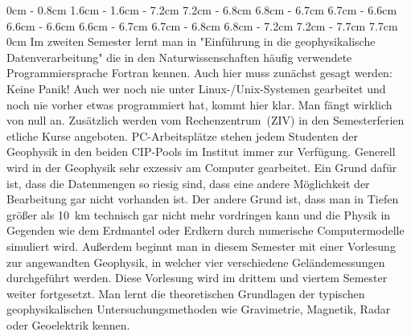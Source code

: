 \begin{multicols}{2}
{}
0cm \columnwidth
0cm \columnwidth
0cm \columnwidth
0cm \columnwidth
0cm \columnwidth
0cm \columnwidth
0cm \columnwidth
0cm \columnwidth
0.8cm \dimexpr\columnwidth - 0.8cm
1.6cm \dimexpr\columnwidth - 1.6cm
\dimexpr\columnwidth - 7.2cm 7.2cm
\dimexpr\columnwidth - 6.8cm 6.8cm
\dimexpr\columnwidth - 6.7cm 6.7cm
\dimexpr\columnwidth - 6.6cm 6.6cm
\dimexpr\columnwidth - 6.6cm 6.6cm
\dimexpr\columnwidth - 6.7cm 6.7cm
\dimexpr\columnwidth - 6.8cm 6.8cm
\dimexpr\columnwidth - 7.2cm 7.2cm
\dimexpr\columnwidth - 7.7cm 7.7cm
0cm \columnwidth
0cm \columnwidth
0cm \columnwidth
0cm \columnwidth
0cm \columnwidth
Im zweiten Semester lernt man in "Einführung in die geophysikalische Datenverarbeitung" die in den Naturwissenschaften häufig verwendete Programmiersprache Fortran kennen.
Auch hier muss zunächst gesagt werden: Keine Panik! Auch wer noch nie unter Linux-/Unix-Systemen gearbeitet und noch nie vorher etwas programmiert hat, kommt hier klar.
Man fängt wirklich von null an.
Zusätzlich werden vom Rechenzentrum~(ZIV) in den Semesterferien etliche Kurse angeboten.
PC-Arbeitsplätze stehen jedem Studenten der Geophysik in den beiden CIP-Pools im Institut immer zur Verfügung.
Generell wird in der Geophysik sehr exzessiv am Computer gearbeitet.
Ein Grund dafür ist, dass die Datenmengen so riesig sind, dass eine andere Möglichkeit der Bearbeitung gar nicht vorhanden ist.
Der andere Grund ist, dass man in Tiefen größer als \SI{10}{\km} technisch gar nicht mehr vordringen kann und die Physik in Gegenden wie dem Erdmantel oder Erdkern durch numerische Computermodelle simuliert wird.
Außerdem beginnt man in diesem Semester mit einer Vorlesung zur angewandten Geophysik, in welcher vier verschiedene Geländemessungen durchgeführt werden. Diese Vorlesung wird im drittem und viertem Semester weiter fortgesetzt.
Man lernt die theoretischen Grundlagen der typischen geophysikalischen Untersuchungsmethoden wie Gravimetrie, Magnetik, Radar oder Geoelektrik kennen.


\end{multicols}
